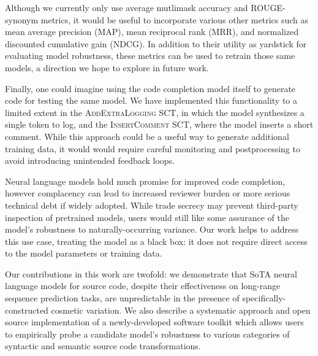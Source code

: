\documentclass[usenames,dvipsnames]{article} %
\begin{document}
  Although we currently only use average mutlimask accuracy and ROUGE-synonym metrics, it would be useful to incorporate various other metrics such as mean average precision (MAP), mean reciprocal rank (MRR), and normalized discounted cumulative gain (NDCG). In addition to their utility as yardstick for evaluating model robustness, these metrics can be used to retrain those same models, a direction we hope to explore in future work.

  Finally, one could imagine using the code completion model itself to generate code for testing the same model. We have implemented this functionality to a limited extent in the \textsc{AddExtraLogging} SCT, in which the model synthesizes a single token to log, and the \textsc{InsertComment} SCT, where the model inserts a short comment. While this approach could be a useful way to generate additional training data, it would would require careful monitoring and postprocessing to avoid introducing unintended feedback loops.

  Neural language models hold much promise for improved code completion, however complacency can lead to increased reviewer burden or more serious technical debt if widely adopted. While trade secrecy may prevent third-party inspection of pretrained models, users would still like some assurance of the model's robustness to naturally-occurring variance. Our work helps to address this use case, treating the model as a black box: it does not require direct access to the model parameters or training data.

  Our contributions in this work are twofold: we demonstrate that SoTA neural language models for source code, despite their effectiveness on long-range sequence prediction tasks, are unpredictable in the presence of specifically-constructed cosmetic variation. We also describe a systematic approach and open source implementation of a newly-developed software toolkit which allows users to empirically probe a candidate model's robustness to various categories of syntactic and semantic source code transformations.
  \pagebreak
  
  \appendix
\end{document}
